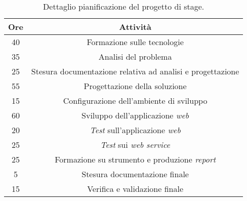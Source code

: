\begin{center}
	\begin{longtable}{|c|c|}
		\caption{Dettaglio pianificazione del progetto di stage.}\\		
		\hline
		\textbf{Ore} & \textbf{Attività}\\
		\hline
		40 & Formazione sulle tecnologie\\
		\hline
		35 & Analisi del problema\\
		\hline
		25 & Stesura documentazione relativa ad analisi e progettazione\\
		\hline
		55 & Progettazione della soluzione\\
		\hline
		15 & Configurazione dell'ambiente di sviluppo\\
		\hline
		60 & Sviluppo dell'applicazione \textit{web}\\
		\hline
		20 & \textit{Test} sull'applicazione \textit{web}\\
		\hline
		25 & \textit{Test} sui \textit{web service}\\
		\hline
		25 & Formazione su strumento e produzione \textit{report}\\
		\hline
		5 & Stesura documentazione finale\\
		\hline
		15 & Verifica e validazione finale\\
		\hline
	\end{longtable}
\end{center}


